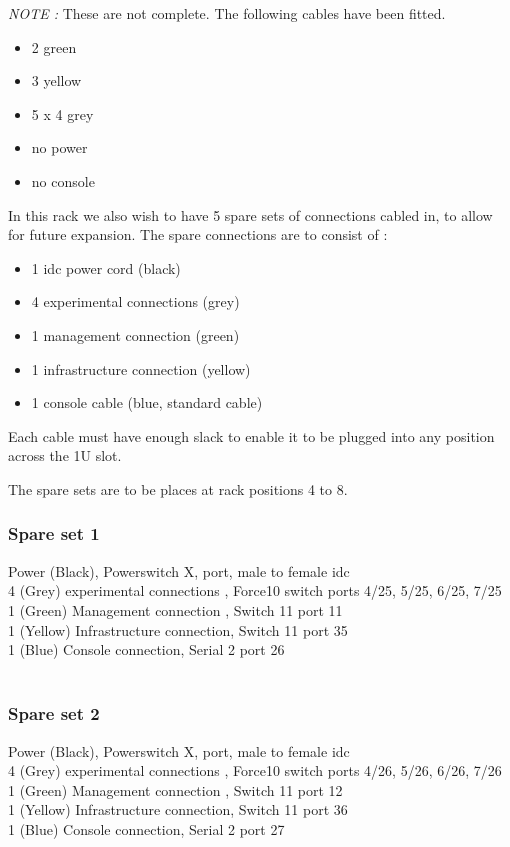\documentclass[a4paper]{article}
\begin{document}
\emph{NOTE :}  These are not complete. The following cables have been
fitted.
\begin{itemize}
\item 2 green
\item 3 yellow
\item 5 x 4 grey
\item no power
\item no console
\end{itemize}

In this rack we also wish to have 5 spare sets of connections cabled
in, to allow for future expansion. The spare connections are to
consist of :
\begin{itemize}
\item 1 idc power cord (black) 
\item 4 experimental connections (grey)
\item 1 management connection (green)
\item 1 infrastructure connection (yellow)
\item 1 console cable (blue, standard cable)
\end{itemize}

Each cable must have enough slack to enable it to be plugged into any
position across the 1U slot. 

The spare sets are to be places at rack positions 4 to 8.
\\
\subsubsection{Spare set 1}
Power (Black), Powerswitch X, port, male to female idc\\
4 (Grey) experimental connections , Force10 switch ports 4/25, 5/25, 6/25, 7/25\\
1 (Green) Management connection , Switch 11 port 11\\
1 (Yellow) Infrastructure connection, Switch 11 port 35\\
1 (Blue) Console connection, Serial 2 port 26\\
\\
\subsubsection{Spare set 2}
Power (Black), Powerswitch X, port, male to female idc\\
4 (Grey) experimental connections , Force10 switch ports 4/26, 5/26, 6/26, 7/26\\
1 (Green) Management connection , Switch 11 port 12\\
1 (Yellow) Infrastructure connection, Switch 11 port 36\\
1 (Blue) Console connection, Serial 2 port 27\\
\\
\end{document}
